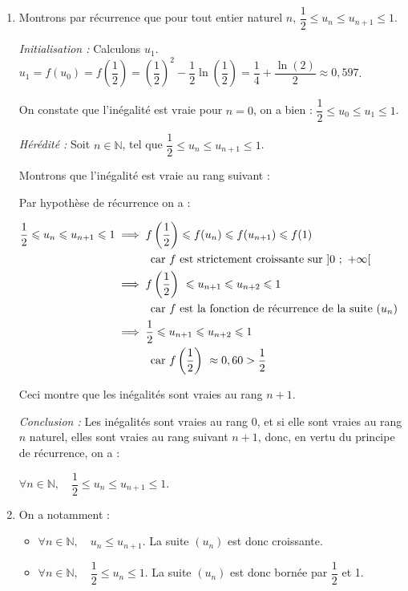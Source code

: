 \documentclass[10pt]{article}
\providecommand{\N}{\mathbb{N}}
\begin{document}
\begin{enumerate}
	\item Montrons par récurrence que pour tout entier naturel  $n$, \quad$\dfrac{1}{2} \leqslant u_n \leqslant u_{n+1} \leqslant 1$.



\emph{Initialisation :} Calculons $u_1$. $u_1 = f(u_0) = f\left(\dfrac{1}{2} \right) = \left(\dfrac{1}{2}\right)^2-\dfrac{1}{2}\ln \left(\dfrac{1}{2}\right)= \dfrac{1}{4} +\dfrac{\ln(2)}{2}\approx 0,597 $.

On constate que l'inégalité est vraie pour $n = 0$, on a bien : \quad $ \dfrac{1}{2}\leqslant u_0 \leqslant u_1 \leqslant 1$.

\smallskip

\emph{Hérédité :} Soit $n \in \N$, tel que \quad $ \dfrac{1}{2}\leqslant u_n \leqslant u_{n+1} \leqslant 1$.

Montrons que l'inégalité est vraie au rang suivant :

Par hypothèse de récurrence on a :

$ \begin{aligned}[t] \dfrac{1}{2}\leqslant u_n \leqslant u_{n+1} \leqslant 1
&\implies f\left(\dfrac{1}{2}\right)\leqslant f(u_n) \leqslant f(u_{n+1}) \leqslant f(1)\\
&\hphantom{\implies}\quad \text{car $f$ est strictement croissante sur }]0~;~+\infty[\\
&\implies f\left(\dfrac{1}{2}\right)\ \leqslant u_{n+1 } \leqslant u_{n+2} \leqslant 1\\
&\hphantom{\implies}\quad \text{car $f$ est la fonction de récurrence de la suite } (u_n)\\
&\implies \dfrac{1}{2} \leqslant u_{n+1 } \leqslant u_{n+2} \leqslant 1\\
&\hphantom{\implies}\quad \text{car } f\left(\dfrac{1}{2}\right)\ \approx 0,60 >\dfrac{1}{2} \\\end{aligned}$

Ceci montre que les  inégalités sont vraies au rang $n + 1$.

\smallskip

\emph{Conclusion :} Les inégalités sont vraies au rang 0, et si elle sont vraies au rang $n$ naturel, elles sont vraies au rang suivant $n + 1$, donc, en vertu du principe de récurrence, on a :

$\forall n \in \N,\quad \dfrac{1}{2} \leqslant u_{n} \leqslant u_{n+1} \leqslant 1$.

	\item On a notamment :
		\begin{itemize}
			\item $\forall n \in \N,\quad u_{n} \leqslant u_{n+1}$. \quad La suite $(u_n)$ est donc  croissante.
			\item $\forall n \in \N,\quad \dfrac{1}{2} \leqslant u_{n}\leqslant 1$. \quad La suite $\left(u_n\right)$ est donc bornée par $\dfrac{1}{2}$ et 1.
		\end{itemize}


\end{enumerate}
\end{document}
